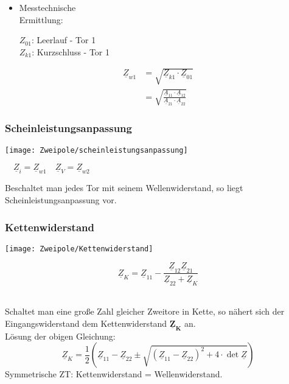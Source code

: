 \begin{minipage}{0.5\columnwidth}
	\small
	\begin{itemize}
	\item Messtechnische\\ Ermittlung:
	
	$Z_{01}$: Leerlauf - Tor 1\\
	$Z_{k1}$: Kurzschluss - Tor 1
	\end{itemize}

	\begin{align*}
		\underline{Z}_{w1} &= \sqrt{\underline{Z}_{k1}\cdot\underline{Z}_{01}}\\
		&=\sqrt{\frac{\underline{A}_{11}\cdot\underline{A}_{12}}{\underline{A}_{21}\cdot\underline{A}_{22}}}
	\end{align*}
\end{minipage}

    
\subsubsection{Scheinleistungsanpassung}
\begin{minipage}{0.55\columnwidth}
	\texttt{[image: Zweipole/scheinleistungsanpassung]}
\end{minipage}
\begin{minipage}{0.45\columnwidth}
$\quad \underline{Z}_i = \underline{Z}_{w1} \quad \underline{Z}_V=\underline{Z}_{w2}
$
\end{minipage}

Beschaltet man jedes Tor mit seinem Wellenwiderstand, so liegt Scheinleistungsanpassung vor.

\subsubsection{Kettenwiderstand}
\begin{minipage}{0.5\columnwidth}
	\texttt{[image: Zweipole/Kettenwiderstand]}
\end{minipage}
\begin{minipage}[b]{0.5\columnwidth}
	$$
	\underline{Z}_K = \underline{Z}_{11} - \frac{\underline{Z}_{12}\underline{Z}_{21}}{\underline{Z}_{22}+\underline{Z}_K}
	$$
\end{minipage}
\\
\small
Schaltet man eine große Zahl gleicher Zweitore in Kette, so nähert sich der
Eingangswiderstand dem Kettenwiderstand $\mathbf{\underline{Z}_K}$ an.\\
L\"osung der obigen Gleichung:
\[
    \underline{Z}_K = \frac{1}{2}(\underline{Z}_{11} - \underline{Z}_{22} \pm \sqrt{(\underline{Z}_{11}-\underline{Z}_{22})^2+4\cdot\operatorname{det}\underline{Z}})
\]
Symmetrische ZT: Kettenwiderstand = Wellenwiderstand.
\normalsize

